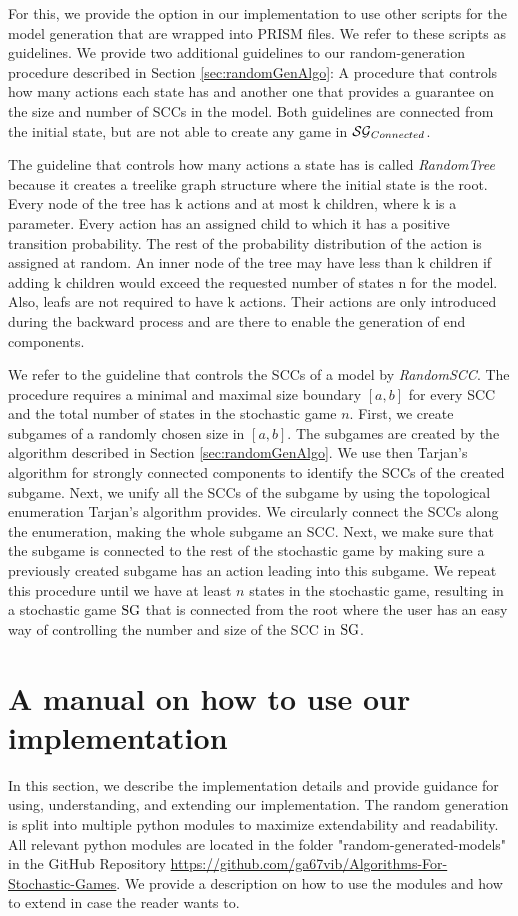 For this, we provide the option in our implementation to use other scripts for the model generation that are wrapped into PRISM files. We refer to these scripts as guidelines.
We provide two additional guidelines to our random-generation procedure described in Section \ref{sec:randomGenAlgo}: 
A procedure that controls how many actions each state has and another one that provides a guarantee on the size and number of SCCs in the model.
Both guidelines are connected from the initial state, but are not able to create any game in $\mathcal{SG}_{Connected}$.

The guideline that controls how many actions a state has is called \emph{RandomTree} 
because it creates a treelike graph structure where the initial state is the root.
Every node of the tree has k actions and at most k children, where k is a parameter. 
Every action has an assigned child to which it has a positive transition probability.
The rest of the probability distribution of the action is assigned at random.
An inner node of the tree may have less than k children if adding k children would exceed the requested number of states n for the model.
Also, leafs are not required to have k actions.
Their actions are only introduced during the backward process and are there to enable the generation of end components.

We refer to the guideline that controls the SCCs of a model by \emph{RandomSCC}.
The procedure requires a minimal and maximal size boundary $[a, b]$ for every SCC and the total number of states in the stochastic game $n$.
First, we create subgames of a randomly chosen size in $[a,b]$.
The subgames are created by the algorithm described in Section \ref{sec:randomGenAlgo}.
We use then Tarjan's algorithm for strongly connected components \cite{TarjansAlgorithm} to identify the SCCs of the created subgame.
Next, we unify all the SCCs of the subgame by using the topological enumeration Tarjan's algorithm provides.
We circularly connect the SCCs along the enumeration, making the whole subgame an SCC.
Next, we make sure that the subgame is connected to the rest of the stochastic game by making sure a previously created subgame has an action
leading into this subgame. We repeat this procedure until we have at least $n$ states in the stochastic game, 
resulting in a stochastic game $\textrm{SG}$ that is connected from the root where the user has an easy way of controlling the number and size of the SCC in $\textrm{SG}$.

\section{A manual on how to use our implementation}
In this section, we describe the implementation details and provide guidance for using, understanding, and extending our implementation.
The random generation is split into multiple python modules to maximize extendability and readability.
All relevant python modules are located in the folder "random-generated-models" in the GitHub Repository \url{https://github.com/ga67vib/Algorithms-For-Stochastic-Games}.
We provide a description on how to use the modules and how to extend in case the reader wants to.

